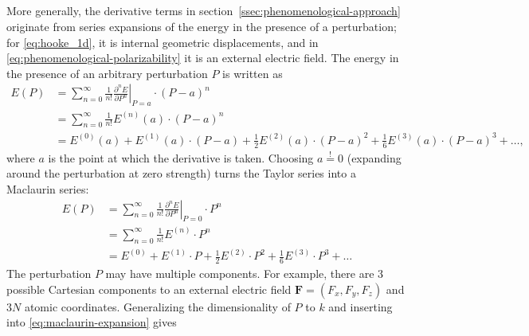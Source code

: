 \documentclass[%
class = book,%
crop = false,%
float = true,%
multi = true,%
preview = false,%
]{standalone}
\begin{document}
\subsection{\texorpdfstring{\href{https://chemistry.stackexchange.com/q/74683/194}{\color{black}{Series expansion}}}{Series expansion}}
\label{ssec:series-expansion}

More generally, the derivative terms in section~\ref{ssec:phenomenological-approach} originate from series expansions of the energy in the presence of a perturbation; for \eqref{eq:hooke_1d}, it is internal geometric displacements, and in \eqref{eq:phenomenological-polarizability} it is an external electric field. The energy in the presence of an arbitrary perturbation \(P\) is written as
\begin{equation}
  \label{eq:taylor-expansion}
  \begin{aligned}
    E(P) &= \sum_{n = 0}^{\infty} \frac{1}{n!} \left. \frac{\partial^{n} E}{\partial P^{n}} \right|_{P = a} \cdot (P - a)^{n} \\
    &= \sum_{n = 0}^{\infty} \frac{1}{n!} E^{(n)}(a) \cdot (P - a)^{n} \\
    &= E^{(0)}(a) + E^{(1)}(a) \cdot (P - a) + \frac{1}{2} E^{(2)}(a) \cdot (P - a)^{2} + \frac{1}{6} E^{(3)}(a) \cdot (P - a)^{3} + \dots ,
  \end{aligned}
\end{equation}
where \(a\) is the point at which the derivative is taken. Choosing \(a \overset{!}{=} 0\) (expanding around the perturbation at zero strength) turns the Taylor series into a Maclaurin series:
\begin{equation}
  \label{eq:maclaurin-expansion}
  \begin{aligned}
    E(P) &= \sum_{n = 0}^{\infty} \frac{1}{n!} \left. \frac{\partial^{n} E}{\partial P^{n}} \right|_{P = 0} \cdot P^{n} \\
    &= \sum_{n = 0}^{\infty} \frac{1}{n!} E^{(n)} \cdot P^{n} \\
    &= E^{(0)} + E^{(1)} \cdot P + \frac{1}{2} E^{(2)} \cdot P^{2} + \frac{1}{6} E^{(3)} \cdot P^{3} + \dots
  \end{aligned}
\end{equation}
The perturbation \(P\) may have multiple components. For example, there are 3 possible Cartesian components to an external electric field \(\mathbf{F} = (F_{x}, F_{y}, F_{z})\) and \(3N\) atomic coordinates. Generalizing the dimensionality of \(P\) to \(k\) and inserting into \eqref{eq:maclaurin-expansion} gives
\end{document}
